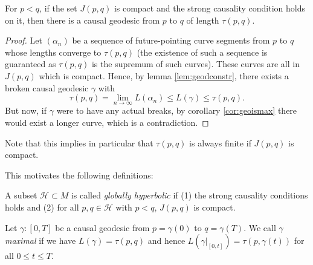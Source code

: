 \begin{proposition}\label{prop:maximalgeo}
For $p<q$, if the set $J(p,q)$ is compact and the strong causality condition holds on it, then there is a causal geodesic from $p$ to $q$ of length $\tau(p,q)$.
\end{proposition}
\begin{proof}
Let $(\alpha_n)$ be a sequence of future-pointing curve segments from $p$ to $q$ whose lengths converge to $\tau(p,q)$ (the existence of such a sequence is guaranteed as $\tau(p,q)$ is the supremum of such curves). These curves are all in $J(p,q)$ which is compact. Hence, by lemma \ref{lem:geodconstr}, there exists a broken causal geodesic $\gamma$ with 
\[
\tau(p,q) = \lim_{n \to \infty} L(\alpha_n) \leq L(\gamma) \leq \tau(p,q).
\]
But now, if $\gamma$ were to have any actual breaks, by corollary \ref{cor:geoismax} there would exist a longer curve, which is a contradiction.
\end{proof}
Note that this implies in particular that $\tau(p,q)$ is always finite if $J(p,q)$ is compact.

This motivates the following definitions:
\begin{definition}
A subset $\mathcal{H}\subset M$ is called \emph{globally hyperbolic} if (1) the strong causality conditions holds and (2) for all $p,q\in \mathcal{H}$ with $p<q$, $J(p,q)$ is compact.
\end{definition}

\begin{definition}
Let $\gamma:[0,T]$ be a causal geodesic from $p=\gamma(0)$ to $q=\gamma(T)$. We call $\gamma$ \emph{maximal} if we have $L(\gamma)=\tau(p,q)$ and hence $L(\gamma\rvert_{[0,t]}) = \tau(p,\gamma(t))$ for all $0\leq t \leq T$.
\end{definition}


